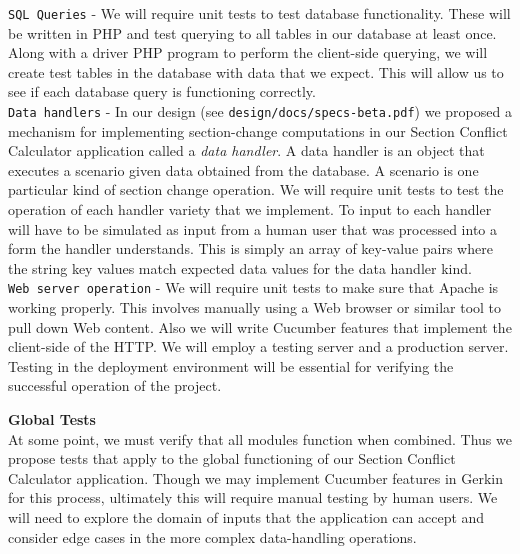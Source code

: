 \documentclass[11pt]{article}
\begin{document}
\begin{adjustwidth}{.25in}{.25in}
  \texttt{SQL Queries} - We will require unit tests to test database functionality. These will be written in PHP and test querying
  to all tables in our database at least once. Along with a driver PHP program to perform the client-side querying, we will create test
  tables in the database with data that we expect. This will allow us to see if each database query is functioning correctly. \\

  \texttt{Data handlers} - In our design (see \texttt{design/docs/specs-beta.pdf}) we proposed a mechanism for implementing section-change
  computations in our Section Conflict Calculator application called a \textit{data handler}. A data handler is an object that executes a
  scenario given data obtained from the database. A scenario is one particular kind of section change operation. We will require unit tests
  to test the operation of each handler variety that we implement. To input to each handler will have to be simulated as input from a human
  user that was processed into a form the handler understands. This is simply an array of key-value pairs where the string key values match
  expected data values for the data handler kind. \\

  \texttt{Web server operation} - We will require unit tests to make sure that Apache is working properly. This involves manually using a Web
  browser or similar tool to pull down Web content. Also we will write Cucumber features that implement the client-side of the HTTP. We will
  employ a testing server and a production server. Testing in the deployment environment will be essential for verifying the successful
  operation of the project.
\end{adjustwidth}

\hspace{-.25in} \textbf{Global Tests} \\
At some point, we must verify that all modules function when combined. Thus we propose tests that apply to the global functioning of our
Section Conflict Calculator application. Though we may implement Cucumber features in Gerkin for this process, ultimately this will require
manual testing by human users. We will need to explore the domain of inputs that the application can accept and consider edge cases in the
more complex data-handling operations.
\end{document}
